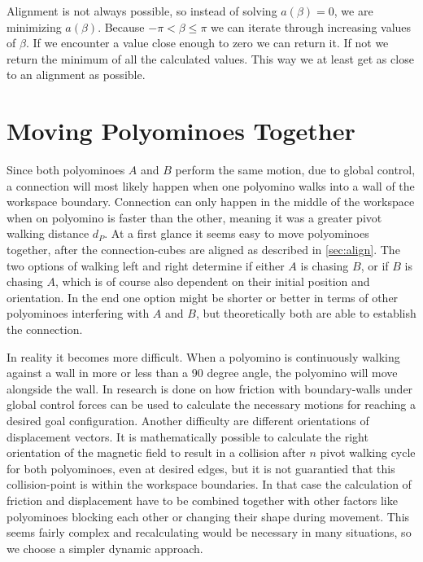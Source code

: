 Alignment is not always possible, so instead of solving $a(\beta) = 0$, we are minimizing $a(\beta)$.
Because $-\pi < \beta \leq \pi$ we can iterate through increasing values of $\beta$.
If we encounter a value close enough to zero we can return it.
If not we return the minimum of all the calculated values.
This way we at least get as close to an alignment as possible.

\section{Moving Polyominoes Together}
\label{sec:walk_wait}

Since both polyominoes $A$ and $B$ perform the same motion, due to global control, a connection will most likely happen when one polyomino walks into a wall of the workspace boundary.
Connection can only happen in the middle of the workspace when on polyomino is faster than the other, meaning it was a greater pivot walking distance $d_P$.
At a first glance it seems easy to move polyominoes together, after the connection-cubes are aligned as described in \autoref{sec:align}.
The two options of walking left and right determine if either $A$ is chasing $B$, or if $B$ is chasing $A$, which is of course also dependent on their initial position and orientation.
In the end one option might be shorter or better in terms of other polyominoes interfering with $A$ and $B$, but theoretically both are able to establish the connection.

In reality it becomes more difficult.
When a polyomino is continuously walking against a wall in more or less than a 90 degree angle, the polyomino will move alongside the wall. In \cite{schmidt2020} research is done on how friction with boundary-walls under global control forces can be used to calculate the necessary motions for reaching a desired goal configuration.
Another difficulty are different orientations of displacement vectors.
It is mathematically possible to calculate the right orientation of the magnetic field to result in a collision after $n$ pivot walking cycle for both polyominoes, even at desired edges, but it is not guarantied that this collision-point is within the workspace boundaries.
In that case the calculation of friction and displacement have to be combined together with other factors like polyominoes blocking each other or changing their shape during movement.
This seems fairly complex and recalculating would be necessary in many situations, so we choose a simpler dynamic approach.


